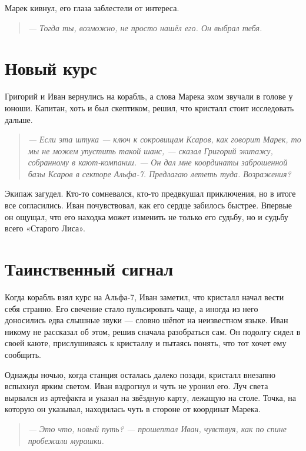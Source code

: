 \documentclass[12pt,a4paper]{book}
\newenvironment{dialogue}{\begin{quote}\itshape}{\end{quote}} %
\begin{document}
Марек кивнул, его глаза заблестели от интереса.

\begin{dialogue}
--- Тогда ты, возможно, не просто нашёл его. Он выбрал тебя.
\end{dialogue}

\section*{Новый курс}

Григорий и Иван вернулись на корабль, а слова Марека эхом звучали в голове у юноши. Капитан, хоть и был скептиком, решил, что кристалл стоит исследовать дальше.

\begin{dialogue}
--- Если эта штука --- ключ к сокровищам Ксаров, как говорит Марек, то мы не можем упустить такой шанс, --- сказал Григорий экипажу, собранному в кают-компании. --- Он дал мне координаты заброшенной базы Ксаров в секторе Альфа-7. Предлагаю лететь туда. Возражения?
\end{dialogue}

Экипаж загудел. Кто-то сомневался, кто-то предвкушал приключения, но в итоге все согласились. Иван почувствовал, как его сердце забилось быстрее. Впервые он ощущал, что его находка может изменить не только его судьбу, но и судьбу всего «Старого Лиса».

\section*{Таинственный сигнал}

Когда корабль взял курс на Альфа-7, Иван заметил, что кристалл начал вести себя странно. Его свечение стало пульсировать чаще, а иногда из него доносились едва слышные звуки --- словно шёпот на неизвестном языке. Иван никому не рассказал об этом, решив сначала разобраться сам. Он подолгу сидел в своей каюте, прислушиваясь к кристаллу и пытаясь понять, что тот хочет ему сообщить.

Однажды ночью, когда станция осталась далеко позади, кристалл внезапно вспыхнул ярким светом. Иван вздрогнул и чуть не уронил его. Луч света вырвался из артефакта и указал на звёздную карту, лежащую на столе. Точка, на которую он указывал, находилась чуть в стороне от координат Марека.

\begin{dialogue}
--- Это что, новый путь? --- прошептал Иван, чувствуя, как по спине пробежали мурашки.
\end{dialogue}
\end{document}
